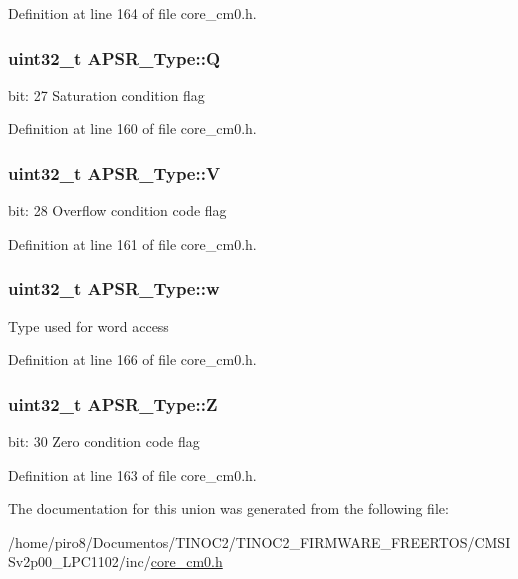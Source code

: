Definition at line 164 of file core\+\_\+cm0.\+h.

\subsubsection[{\texorpdfstring{Q}{Q}}]{\setlength{\rightskip}{0pt plus 5cm}uint32\+\_\+t A\+P\+S\+R\+\_\+\+Type\+::Q}\hypertarget{union_a_p_s_r___type_a22d10913489d24ab08bd83457daa88de}{}\label{union_a_p_s_r___type_a22d10913489d24ab08bd83457daa88de}
bit\+: 27 Saturation condition flag 

Definition at line 160 of file core\+\_\+cm0.\+h.

\subsubsection[{\texorpdfstring{V}{V}}]{\setlength{\rightskip}{0pt plus 5cm}uint32\+\_\+t A\+P\+S\+R\+\_\+\+Type\+::V}\hypertarget{union_a_p_s_r___type_a8004d224aacb78ca37774c35f9156e7e}{}\label{union_a_p_s_r___type_a8004d224aacb78ca37774c35f9156e7e}
bit\+: 28 Overflow condition code flag 

Definition at line 161 of file core\+\_\+cm0.\+h.

\subsubsection[{\texorpdfstring{w}{w}}]{\setlength{\rightskip}{0pt plus 5cm}uint32\+\_\+t A\+P\+S\+R\+\_\+\+Type\+::w}\hypertarget{union_a_p_s_r___type_ae4c2ef8c9430d7b7bef5cbfbbaed3a94}{}\label{union_a_p_s_r___type_ae4c2ef8c9430d7b7bef5cbfbbaed3a94}
Type used for word access 

Definition at line 166 of file core\+\_\+cm0.\+h.

\subsubsection[{\texorpdfstring{Z}{Z}}]{\setlength{\rightskip}{0pt plus 5cm}uint32\+\_\+t A\+P\+S\+R\+\_\+\+Type\+::Z}\hypertarget{union_a_p_s_r___type_a3b04d58738b66a28ff13f23d8b0ba7e5}{}\label{union_a_p_s_r___type_a3b04d58738b66a28ff13f23d8b0ba7e5}
bit\+: 30 Zero condition code flag 

Definition at line 163 of file core\+\_\+cm0.\+h.



The documentation for this union was generated from the following file\+:\begin{DoxyCompactItemize}
\item 
/home/piro8/\+Documentos/\+T\+I\+N\+O\+C2/\+T\+I\+N\+O\+C2\+\_\+\+F\+I\+R\+M\+W\+A\+R\+E\+\_\+\+F\+R\+E\+E\+R\+T\+O\+S/\+C\+M\+S\+I\+Sv2p00\+\_\+\+L\+P\+C1102/inc/\hyperlink{core__cm0_8h}{core\+\_\+cm0.\+h}\end{DoxyCompactItemize}
